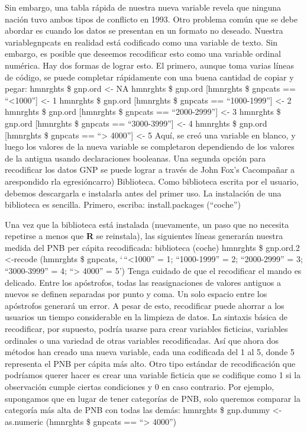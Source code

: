 \documentclass[
]{book}
\begin{document}
Sin embargo, una tabla rápida de nuestra nueva variable revela que ninguna nación tuvo ambos tipos de conflicto en 1993.
Otro problema común que se debe abordar es cuando los datos se presentan en un formato no deseado. Nuestra variablegnpcats en realidad está codificado como una variable de texto. Sin embargo, es posible que deseemos recodificar esto como una variable ordinal numérica. Hay dos formas de lograr esto. El primero, aunque toma varias líneas de código, se puede completar rápidamente con una buena cantidad de copiar y pegar:
hmnrghts \$ gnp.ord \textless- NA
hmnrghts \$ gnp.ord {[}hmnrghts \$ gnpcats == ``\textless1000''{]} \textless- 1 hmnrghts \$ gnp.ord {[}hmnrghts \$ gnpcats == ``1000-1999''{]} \textless- 2 hmnrghts \$ gnp.ord {[}hmnrghts \$ gnpcats == ``2000-2999''{]} \textless- 3 hmnrghts \$ gnp.ord {[}hmnrghts \$ gnpcats == ``3000-3999''{]} \textless- 4 hmnrghts \$ gnp.ord {[}hmnrghts \$ gnpcats == ``\textgreater{} 4000''{]} \textless- 5
Aquí, se creó una variable en blanco, y luego los valores de la nueva variable se completaron dependiendo de los valores de la antigua usando declaraciones booleanas.
Una segunda opción para recodificar los datos GNP se puede lograr a través de John Fox's
Cacompañar a arespondido rla egresióncarro) Biblioteca. Como biblioteca escrita por el usuario, debemos descargarla e instalarla antes del primer uso. La instalación de una biblioteca es sencilla. Primero, escriba:
install.packages (``coche'')

Una vez que la biblioteca está instalada (nuevamente, un paso que no necesita repetirse a menos que \textbf{R} se reinstala), las siguientes líneas generarán nuestra medida del PNB per cápita recodificada:
biblioteca (coche)
hmnrghts \$ gnp.ord.2 \textless-recode (hmnrghts \$ gnpcats, `\,``\textless1000'' = 1; ``1000-1999'' = 2; ``2000-2999'' = 3; ``3000-3999'' = 4; ``\textgreater{} 4000'' = 5')
Tenga cuidado de que el recodificar el mando es delicado. Entre los apóstrofos, todas las reasignaciones de valores antiguos a nuevos se definen separadas por punto y coma. Un solo espacio entre los apóstrofos generará un error. A pesar de esto,
recodificar puede ahorrar a los usuarios un tiempo considerable en la limpieza de datos. La sintaxis básica de recodificar, por supuesto, podría usarse para crear variables ficticias, variables ordinales o una variedad de otras variables recodificadas. Así que ahora dos métodos han creado una nueva variable, cada una codificada del 1 al 5, donde 5 representa el PNB per cápita más alto.
Otro tipo estándar de recodificación que podríamos querer hacer es crear una variable
ficticia que se codifique como 1 si la observación cumple ciertas condiciones y 0 en caso contrario. Por ejemplo, supongamos que en lugar de tener categorías de PNB, solo queremos comparar la categoría más alta de PNB con todas las demás:
hmnrghts \$ gnp.dummy \textless-as.numeric (hmnrghts \$ gnpcats == ``\textgreater{} 4000'')
\end{document}

